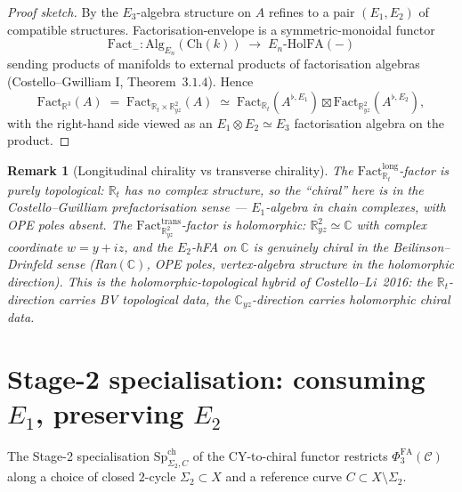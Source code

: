 \documentclass[11pt]{article}
\newtheorem{remark}[theorem]{Remark}
\newcommand{\Eone}{E_{1}}
\newcommand{\Etwo}{E_{2}}
\newcommand{\Ethree}{E_{3}}
\newcommand{\En}{E_{n}}
\newcommand{\Alg}{\mathrm{Alg}}
\newcommand{\R}{\mathbb{R}}
\newcommand{\C}{\mathbb{C}}
\newcommand{\PhiFA}{\Phi^{\mathrm{FA}}}
\newcommand{\SpCh}{\mathrm{Sp}^{\mathrm{ch}}}
\newcommand{\HolFA}{\mathrm{HolFA}}
\newcommand{\cC}{\mathcal{C}}
\begin{document}
\begin{proof}[Proof sketch]
By  the $\Ethree$-algebra structure on $A$ refines to
a pair $(\Eone, \Etwo)$ of compatible structures. Factorisation-envelope
is a symmetric-monoidal functor
\[
  \mathrm{Fact}_{-} \colon \Alg_{\En}(\mathrm{Ch}(k))
  \;\to\; \En\text{-}\HolFA(-)
\]
sending products of manifolds to external products of factorisation
algebras (Costello--Gwilliam I, Theorem~$3.1.4$). Hence
\[
  \mathrm{Fact}_{\R^{3}}(A) \;=\; \mathrm{Fact}_{\R_{t} \times \R^{2}_{yz}}(A)
  \;\simeq\;
  \mathrm{Fact}_{\R_{t}}(A^{\flat, \Eone}) \boxtimes
  \mathrm{Fact}_{\R^{2}_{yz}}(A^{\flat, \Etwo}),
\]
with the right-hand side viewed as an $E_{1} \otimes E_{2} \simeq E_{3}$
factorisation algebra on the product.
\end{proof}

\begin{remark}[Longitudinal chirality vs transverse chirality]
The $\mathrm{Fact}^{\mathrm{long}}_{\R_{t}}$-factor is purely
topological: $\R_{t}$ has no complex structure, so the ``chiral'' here
is in the Costello--Gwilliam prefactorisation sense --- $E_{1}$-algebra
in chain complexes, with OPE poles absent. The
$\mathrm{Fact}^{\mathrm{trans}}_{\R^{2}_{yz}}$-factor is holomorphic:
$\R^{2}_{yz} \simeq \C$ with complex coordinate $w = y + iz$, and the
$E_{2}$-hFA on $\C$ is genuinely chiral in the Beilinson--Drinfeld sense
(Ran$(\C)$, OPE poles, vertex-algebra structure in the holomorphic
direction). This is the holomorphic-topological hybrid of
Costello--Li~2016: the $\R_{t}$-direction carries BV topological data,
the $\C_{yz}$-direction carries holomorphic chiral data.
\end{remark}

\section{Stage-2 specialisation: consuming $E_{1}$, preserving $E_{2}$}
\label{sec:stage2-consumption}

The Stage-2 specialisation $\SpCh_{\Sigma_{2}, C}$ of the CY-to-chiral
functor restricts $\PhiFA_{3}(\cC)$ along a choice of closed
$2$-cycle $\Sigma_{2} \subset X$ and a reference curve
$C \subset X \setminus \Sigma_{2}$.
\end{document}
